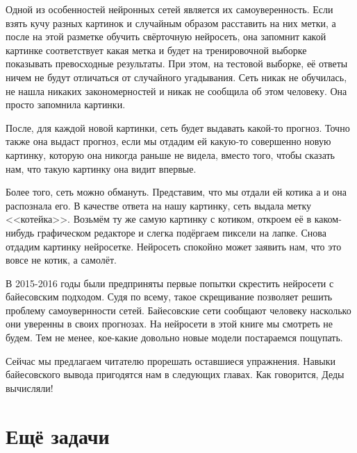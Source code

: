 Одной из особенностей нейронных сетей является их самоуверенность. Если взять кучу разных картинок и случайным образом расставить на них метки, а после на этой разметке обучить свёрточную нейросеть, она запомнит какой картинке соответствует какая метка и будет на тренировочной выборке показывать превосходные результаты. При этом, на тестовой выборке, её ответы ничем не будут отличаться от случайного угадывания. Сеть никак не обучилась, не нашла никаких закономерностей и никак не сообщила об этом человеку. Она просто запомнила картинки.  

После, для каждой новой картинки, сеть будет выдавать какой-то прогноз. Точно также она выдаст прогноз, если мы отдадим ей какую-то совершенно новую картинку, которую она никогда раньше не видела, вместо того, чтобы сказать нам, что такую картинку она видит впервые. 

Более того, сеть можно обмануть. Представим, что мы отдали ей котика а и она распознала его. В качестве ответа на нашу картинку, сеть выдала метку <<котейка>>. Возьмём ту же самую картинку с котиком, откроем её в каком-нибудь графическом редакторе и слегка подёргаем пиксели на лапке. Снова отдадим картинку нейросетке. Нейросеть спокойно может заявить нам, что это вовсе не котик, а самолёт. 

В 2015-2016 годы были предприняты первые попытки скрестить нейросети с байесовским подходом. Судя по всему, такое скрещивание позволяет решить проблему самоувернности сетей. Байесовские сети сообщают человеку насколько они уверенны в своих прогнозах. На нейросети в этой книге мы смотреть не будем. Тем не менее, кое-какие довольно новые модели постараемся пощупать.

Сейчас мы предлагаем читателю прорешать оставшиеся упражнения. Навыки байесовского вывода пригодятся нам в следующих главах.  Как говорится, Деды вычисляли! 


\section{Ещё задачи} 

